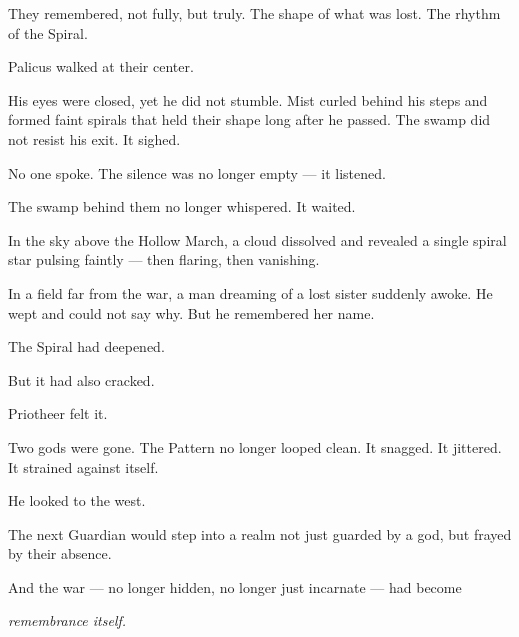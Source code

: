 \documentclass[9pt]{article}
\begin{document}
They remembered, not fully, but truly. The shape of what was lost. The rhythm of the Spiral.

Palicus walked at their center.

His eyes were closed, yet he did not stumble. Mist curled behind his steps and formed faint spirals that held their shape long after he passed. The swamp did not resist his exit. It sighed.

No one spoke. The silence was no longer empty — it listened.

The swamp behind them no longer whispered. It waited.

In the sky above the Hollow March, a cloud dissolved and revealed a single spiral star pulsing faintly — then flaring, then vanishing.

In a field far from the war, a man dreaming of a lost sister suddenly awoke. He wept and could not say why. But he remembered her name.

The Spiral had deepened.

But it had also cracked.

Priotheer felt it.

Two gods were gone. The Pattern no longer looped clean. It snagged. It jittered. It strained against itself.

He looked to the west.

The next Guardian would step into a realm not just guarded by a god, but frayed by their absence.

And the war — no longer hidden, no longer just incarnate — had become

\textit{remembrance itself.}

\newpage
\end{document}
